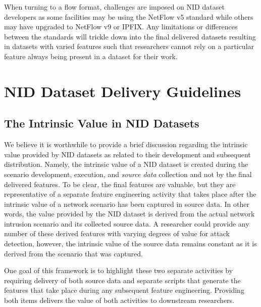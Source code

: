 \documentclass[sigconf]{acmart}
\begin{document}
When turning to a flow format, challenges are imposed on NID dataset developers as some facilities may be using the NetFlow v5 standard while others may have upgraded to NetFlow v9 or IPFIX.
Any limitations or differences between the standards will trickle down into the final delivered datasets resulting in datasets with varied features such that researchers cannot rely on a particular feature always being present in a dataset for their work.

\section{NID Dataset Delivery Guidelines}\label{sec:nidddf}

\subsection{The Intrinsic Value in NID Datasets}\label{sec:intrinsic_value}
We believe it is worthwhile to provide a brief discussion regarding the intrinsic value provided by NID datasets as related to their development and subsequent distribution.
Namely, the intrinsic value of a NID dataset is created during the scenario development, execution, and \textit{source data} collection and not by the final delivered features.
To be clear, the final features are valuable, but they are representative of a separate feature engineering activity that takes place after the intrinsic value of a network scenario has been captured in source data.
In other words, the value provided by the NID dataset is derived from the actual network intrusion scenario and its collected source data. 
A researcher could provide any number of these derived features with varying degrees of value for attack detection, however, the intrinsic value of the source data remains constant as it is derived from the scenario that was captured.

One goal of this framework is to highlight these two separate activities by requiring delivery of both source data and separate scripts that generate the features that take place during any subsequent feature engineering.
Providing both items delivers the value of both activities to downstream researchers.
\end{document}
